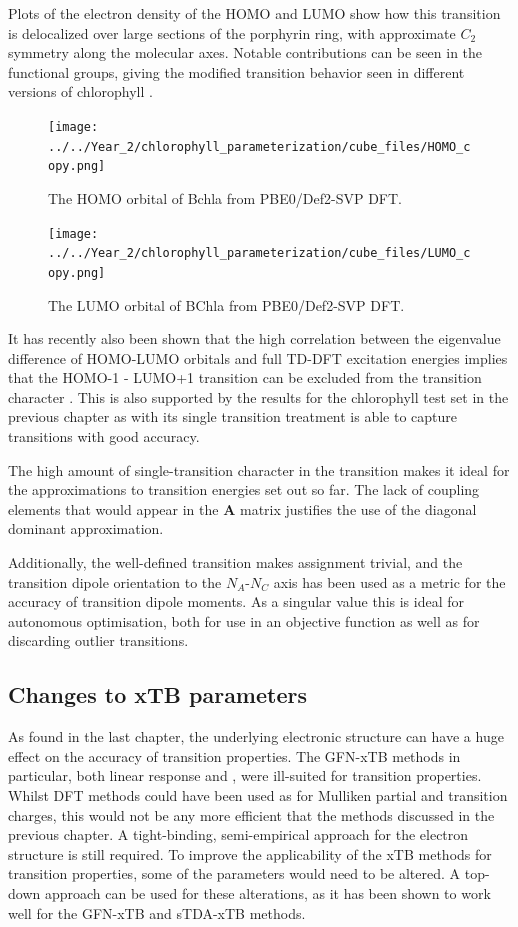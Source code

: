 Plots of the electron density of the HOMO and LUMO show how this transition is delocalized
over large sections of the porphyrin ring, with approximate $C_2$ symmetry along
the molecular axes. Notable contributions can be seen in the functional groups,
giving the modified transition behavior seen in different versions of chlorophyll \cite{BelenOviedo2011}.

\begin{figure}
    \centering
    \texttt{[image: ../../Year\_2/chlorophyll\_parameterization/cube\_files/HOMO\_copy.png]}
    \caption{The HOMO orbital of Bchla from PBE0/Def2-SVP DFT.}
    \label{fig:HOMO}
\end{figure}

\begin{figure}
    \centering
    \texttt{[image: ../../Year\_2/chlorophyll\_parameterization/cube\_files/LUMO\_copy.png]}
    \caption{The LUMO orbital of BChla from PBE0/Def2-SVP DFT.}
\end{figure}

It has recently also been shown that the high correlation between the eigenvalue
difference of HOMO-LUMO orbitals and full TD-DFT excitation energies implies that
the HOMO-1 - LUMO+1 transition can be excluded from the transition character \cite{Saito2020}.
This is also supported by the results for the chlorophyll test set in the previous
chapter as \dscf with its single transition treatment is able to capture \Qy transitions
with good accuracy.

The high amount of single-transition character in the \Qy transition makes it ideal
for the approximations to transition energies set out so far. The lack of coupling
elements that would appear in the $\mathbf{A}$ matrix justifies the use of the diagonal
dominant approximation.

Additionally, the well-defined transition makes assignment trivial, and the transition
dipole orientation to the $N_A$-$N_C$ axis has been used as a metric for the accuracy
of transition dipole moments. As a singular value this is ideal for autonomous optimisation,
both for use in an objective function as well as for discarding outlier transitions.

\subsection{Changes to xTB parameters}
\label{subsec:chl_method}

As found in the last chapter, the underlying electronic structure can have a huge
effect on the accuracy of transition properties. The GFN-xTB methods in particular,
both linear response and \dxtb, were ill-suited for transition properties. Whilst
DFT methods could have been used as for Mulliken partial and transition charges,
this would not be any more efficient that the \dscf methods discussed in the previous 
chapter. A tight-binding, semi-empirical approach for the electron structure is still 
required. To improve the applicability of the xTB methods for transition properties, 
some of the parameters would need to be altered. A top-down approach can be used 
for these alterations, as it has been shown to work well for the GFN-xTB and sTDA-xTB
methods. 

